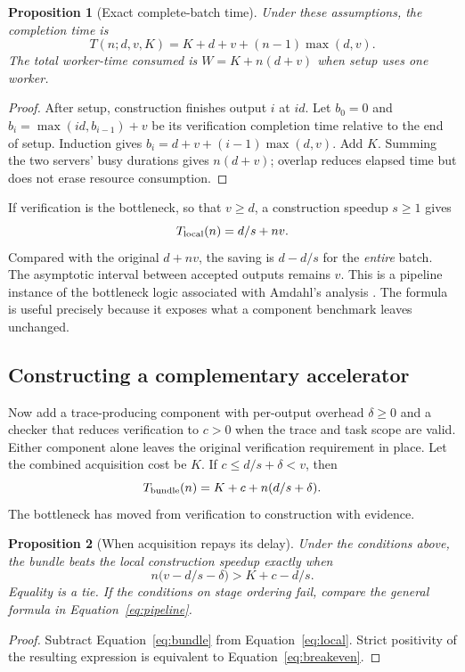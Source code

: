 \documentclass[11pt,letterpaper]{article}
\newtheorem{proposition}{Proposition}[section]
\theoremstyle{remark}\newtheorem{remark}{Remark}[section]
\begin{document}
\begin{proposition}[Exact complete-batch time]\label{prop:pipeline}
Under these assumptions, the completion time is
\begin{equation}\label{eq:pipeline}
 T(n;d,v,K)=K+d+v+(n-1)\max(d,v).
\end{equation}
The total worker-time consumed is $W=K+n(d+v)$ when setup uses one worker.
\end{proposition}
\begin{proof}
After setup, construction finishes output $i$ at $id$.
Let $b_0=0$ and $b_i=\max(id,b_{i-1})+v$ be its verification completion time relative to the end of setup.
Induction gives $b_i=d+v+(i-1)\max(d,v)$.
Add $K$.
Summing the two servers' busy durations gives $n(d+v)$; overlap reduces elapsed time but does not erase resource consumption.
\end{proof}

If verification is the bottleneck, so that $v\ge d$, a construction speedup $s\ge1$ gives
\begin{equation}\label{eq:local}
 T_{\rm local}(n)=d/s+nv.
\end{equation}
Compared with the original $d+nv$, the saving is $d-d/s$ for the \emph{entire} batch.
The asymptotic interval between accepted outputs remains $v$.
This is a pipeline instance of the bottleneck logic associated with Amdahl's analysis \citep{amdahl1967}.
The formula is useful precisely because it exposes what a component benchmark leaves unchanged.

\subsection{Constructing a complementary accelerator}
Now add a trace-producing component with per-output overhead $\delta\ge0$ and a checker that reduces verification to $c>0$ when the trace and task scope are valid.
Either component alone leaves the original verification requirement in place.
Let the combined acquisition cost be $K$.
If $c\le d/s+\delta<v$, then
\begin{equation}\label{eq:bundle}
 T_{\rm bundle}(n)=K+c+n(d/s+\delta).
\end{equation}
The bottleneck has moved from verification to construction with evidence.

\begin{proposition}[When acquisition repays its delay]\label{prop:breakeven}
Under the conditions above, the bundle beats the local construction speedup exactly when
\begin{equation}\label{eq:breakeven}
 n\bigl(v-d/s-\delta\bigr)>K+c-d/s.
\end{equation}
Equality is a tie. If the conditions on stage ordering fail, compare the general formula in Equation~\eqref{eq:pipeline}.
\end{proposition}
\begin{proof}
Subtract Equation~\eqref{eq:bundle} from Equation~\eqref{eq:local}.
Strict positivity of the resulting expression is equivalent to Equation~\eqref{eq:breakeven}.
\end{proof}
\end{document}
